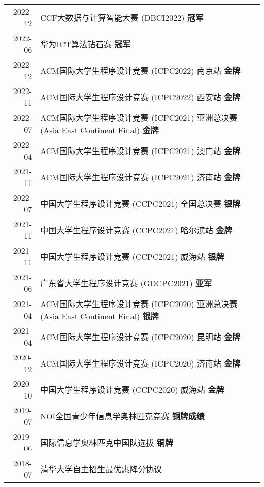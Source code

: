%
%



\begin{tabular}{rl}	
	2022-12 & CCF大数据与计算智能大赛 (DBCI2022) \enspace \textbf{冠军} \\
	2022-06 & 华为ICT算法钻石赛 \enspace \textbf{冠军} \\

	2022-12 & ACM国际大学生程序设计竞赛 (ICPC2022) 南京站 \enspace \textbf{金牌} \\
	2022-11 & ACM国际大学生程序设计竞赛 (ICPC2022) 西安站 \enspace \textbf{金牌} \\
	2022-07 & ACM国际大学生程序设计竞赛 (ICPC2021) 亚洲总决赛 (Asia East Continent Final)  \enspace \textbf{金牌} \\
	2022-04 & ACM国际大学生程序设计竞赛 (ICPC2021) 澳门站 \enspace \textbf{金牌} \\
	2021-11 & ACM国际大学生程序设计竞赛 (ICPC2021) 济南站 \enspace \textbf{金牌} \\
	2022-07 & 中国大学生程序设计竞赛 (CCPC2021) 全国总决赛 \enspace \textbf{银牌} \\
	2021-11 & 中国大学生程序设计竞赛 (CCPC2021) 哈尔滨站 \enspace \textbf{金牌} \\
	2021-11 & 中国大学生程序设计竞赛 (CCPC2021) 威海站 \enspace \textbf{银牌} \\
	2021-06 & 广东省大学生程序设计竞赛 (GDCPC2021) \enspace \textbf{亚军} \\
	2021-04 & ACM国际大学生程序设计竞赛 (ICPC2020) 亚洲总决赛 (Asia East Continent Final)  \enspace \textbf{银牌} \\
	2021-04 & ACM国际大学生程序设计竞赛 (ICPC2020) 昆明站 \enspace \textbf{金牌} \\
	2020-12 & ACM国际大学生程序设计竞赛 (ICPC2020) 济南站 \enspace \textbf{金牌} \\
	2020-10 & 中国大学生程序设计竞赛 (CCPC2020) 威海站 \enspace \textbf{金牌} \\
	2019-07 & NOI全国青少年信息学奥林匹克竞赛 \enspace \textbf{铜牌成绩} \\
	2019-06 & 国际信息学奥林匹克中国队选拔 \enspace \textbf{铜牌} \\
	2018-07 & 清华大学自主招生最优惠降分协议 \\
\end{tabular}


